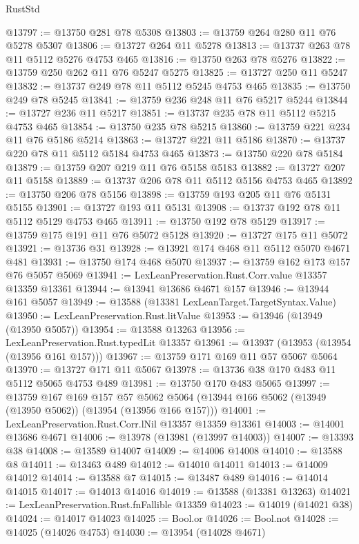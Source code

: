 \begin{lexlean}{RustStd}
\begin{coremodule}
@13797 := @13750 @281 @78 @5308
@13803 := @13759 @264 @280 @11 @76 @5278 @5307
@13806 := @13727 @264 @11 @5278
@13813 := @13737 @263 @78 @11 @5112 @5276 @4753 @465
@13816 := @13750 @263 @78 @5276
@13822 := @13759 @250 @262 @11 @76 @5247 @5275
@13825 := @13727 @250 @11 @5247
@13832 := @13737 @249 @78 @11 @5112 @5245 @4753 @465
@13835 := @13750 @249 @78 @5245
@13841 := @13759 @236 @248 @11 @76 @5217 @5244
@13844 := @13727 @236 @11 @5217
@13851 := @13737 @235 @78 @11 @5112 @5215 @4753 @465
@13854 := @13750 @235 @78 @5215
@13860 := @13759 @221 @234 @11 @76 @5186 @5214
@13863 := @13727 @221 @11 @5186
@13870 := @13737 @220 @78 @11 @5112 @5184 @4753 @465
@13873 := @13750 @220 @78 @5184
@13879 := @13759 @207 @219 @11 @76 @5158 @5183
@13882 := @13727 @207 @11 @5158
@13889 := @13737 @206 @78 @11 @5112 @5156 @4753 @465
@13892 := @13750 @206 @78 @5156
@13898 := @13759 @193 @205 @11 @76 @5131 @5155
@13901 := @13727 @193 @11 @5131
@13908 := @13737 @192 @78 @11 @5112 @5129 @4753 @465
@13911 := @13750 @192 @78 @5129
@13917 := @13759 @175 @191 @11 @76 @5072 @5128
@13920 := @13727 @175 @11 @5072
@13921 := @13736 @31
@13928 := @13921 @174 @468 @11 @5112 @5070 @4671 @481
@13931 := @13750 @174 @468 @5070
@13937 := @13759 @162 @173 @157 @76 @5057 @5069
@13941 := LexLeanPreservation.Rust.Corr.value @13357 @13359 @13361
@13944 := @13941 @13686 @4671 @157
@13946 := @13944 @161 @5057
@13949 := @13588 (@13381 LexLeanTarget.TargetSyntax.Value)
@13950 := LexLeanPreservation.Rust.litValue
@13953 := @13946 (@13949 (@13950 @5057))
@13954 := @13588 @13263
@13956 := LexLeanPreservation.Rust.typedLit @13357
@13961 := @13937 (@13953 (@13954 (@13956 @161 @157)))
@13967 := @13759 @171 @169 @11 @57 @5067 @5064
@13970 := @13727 @171 @11 @5067
@13978 := @13736 @38 @170 @483 @11 @5112 @5065 @4753 @489
@13981 := @13750 @170 @483 @5065
@13997 := @13759
    @167
    @169
    @157
    @57
    @5062
    @5064
    (@13944 @166 @5062 (@13949 (@13950 @5062)) (@13954 (@13956 @166 @157)))
@14001 := LexLeanPreservation.Rust.Corr.lNil @13357 @13359 @13361
@14003 := @14001 @13686 @4671
@14006 := @13978 (@13981 (@13997 @14003))
@14007 := @13393 @38
@14008 := @13589 @14007
@14009 := @14006 @14008
@14010 := @13588 @8
@14011 := @13463 @489
@14012 := @14010 @14011
@14013 := @14009 @14012
@14014 := @13588 @7
@14015 := @13487 @489
@14016 := @14014 @14015
@14017 := @14013 @14016
@14019 := @13588 (@13381 @13263)
@14021 := LexLeanPreservation.Rust.fnFallible @13359
@14023 := @14019 (@14021 @38)
@14024 := @14017 @14023
@14025 := Bool.or
@14026 := Bool.not
@14028 := @14025 (@14026 @4753)
@14030 := @13954 (@14028 @4671)

\end{coremodule}
\end{lexlean}
